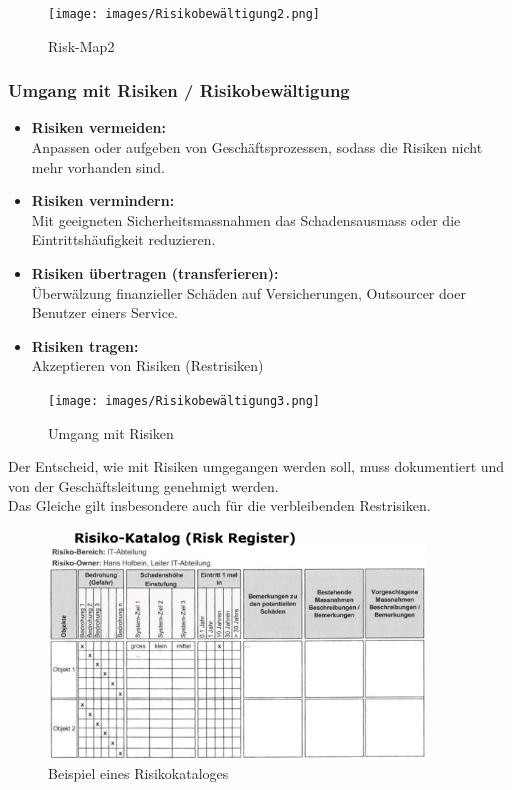 \documentclass[10pt,a4paper]{article}
\begin{document}
\begin{figure}[H]
    \begin{center}
    \texttt{[image: images/Risikobewältigung2.png]}
    \caption{Risk-Map2}
    \label{Risk-Map2}
    \end{center}
\end{figure}

\subsubsection*{Umgang mit Risiken / Risikobewältigung }
\begin{itemize}[noitemsep,topsep=0pt,leftmargin=*]
    \item \textbf{Risiken vermeiden:}\\Anpassen oder aufgeben von Geschäftsprozessen, sodass die Risiken nicht mehr vorhanden sind.
    \item \textbf{Risiken vermindern:}\\Mit geeigneten Sicherheitsmassnahmen das Schadensausmass oder die Eintrittshäufigkeit reduzieren.
    \item \textbf{Risiken übertragen (transferieren):}\\Überwälzung finanzieller Schäden auf Versicherungen, Outsourcer doer Benutzer einers Service.
    \item \textbf{Risiken tragen:}\\Akzeptieren von Risiken (Restrisiken)
\end{itemize}

\begin{figure}[H]
    \begin{center}
    \texttt{[image: images/Risikobewältigung3.png]}
    \caption{Umgang mit Risiken}
    \label{Umgang mit Risiken}
    \end{center}
\end{figure}
\noindent
Der Entscheid, wie mit Risiken umgegangen werden soll, muss dokumentiert und von der Geschäftsleitung genehmigt werden.\\Das Gleiche gilt insbesondere auch für die verbleibenden Restrisiken.
\begin{figure}[H]
    \begin{center}
    \includegraphics[width=10cm]{images/Risiko-Katalog.png}
    \caption{Beispiel eines Risikokataloges}
    \label{risikokatalog}
    \end{center}
\end{figure}
\end{document}
